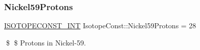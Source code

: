 \subsubsection{\texorpdfstring{Nickel59\+Protons}{Nickel59Protons}}
{\footnotesize\ttfamily \mbox{\hyperlink{group___isotope_const-_macros_ga5f18360b3e99483a35c32d789e62621c}{I\+S\+O\+T\+O\+P\+E\+C\+O\+N\+S\+T\+\_\+\+I\+NT}} Isotope\+Const\+::\+Nickel59\+Protons = 28}

\$ \$ Protons in Nickel-\/59. 